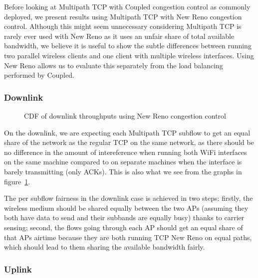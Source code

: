 Before looking at Multipath TCP with Coupled congestion control as commonly
deployed, we present results using Multipath TCP with New Reno congestion
control. Although this might seem unnecessary considering Multipath TCP is
rarely ever used with New Reno as it uses an unfair share of total available
bandwidth, we believe it is useful to show the subtle differences between
running two parallel wireless clients and one client with multiple wireless
interfaces. Using New Reno allows us to evaluate this separately from the
load balancing performed by Coupled.

\subsubsection{Downlink}

\begin{figure}[h]
 \centering
 \subfloat[][2.4 GHz, disparate channel] {\
 }
 \subfloat[][5 and 2.4 GHz] {\
 }

 \caption{CDF of downlink throughputs using New Reno congestion control}\label{graph:reno-down}
\end{figure}

On the downlink, we are expecting each Multipath TCP subflow to get an equal
share of the network as the regular TCP on the same network, as there should be
no difference in the amount of intereference when running both WiFi interfaces
on the same machine compared to on separate machines when the interface is
barely transmitting (only ACKs). This is also what we see from the graphs in
figure~\ref{graph:reno-down}.

The per subflow fairness in the downlink case is achieved in two steps: firstly,
the wireless medium should be shared equally between the two APs (assuming they
both have data to send and their subbands are equally busy) thanks to carrier
sensing; second, the flows going through each AP should get an equal share of
that APs airtime because they are both running TCP New Reno on equal paths,
which should lead to them sharing the available bandwidth fairly.

\subsubsection{Uplink}

